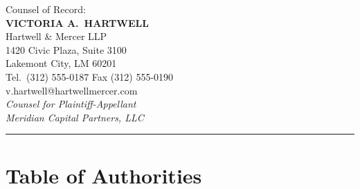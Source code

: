 \documentclass[12pt]{article}
\newcommand{\goldrule}{%
  {\color{GoldAccent}\rule{\linewidth}{0.8pt}}%
}
\begin{document}
\begin{center}
\vspace{20pt}

{\small\color{SlateGrey} Counsel of Record:}\\[4pt]
{\normalsize\bfseries\color{NavyDeep} VICTORIA A.\ HARTWELL}\\
{\small\color{SlateGrey} Hartwell \& Mercer LLP}\\
{\small\color{SlateGrey} 1420 Civic Plaza, Suite 3100}\\
{\small\color{SlateGrey} Lakemont City, LM 60201}\\
{\small\color{SlateGrey} Tel.\ (312) 555-0187 \quad Fax (312) 555-0190}\\
{\small\color{SlateGrey} v.hartwell@hartwellmercer.com}\\[10pt]

{\small\color{SlateGrey} \textit{Counsel for Plaintiff-Appellant\\Meridian Capital Partners, LLC}}\\[20pt]


\end{center}

\clearpage

\renewcommand{\contentsname}{\color{NavyDeep}\scshape Table of Contents}
\tableofcontents

\vspace{24pt}
\goldrule

\clearpage


\section*{Table of Authorities}

\vspace{4pt}
\end{document}
